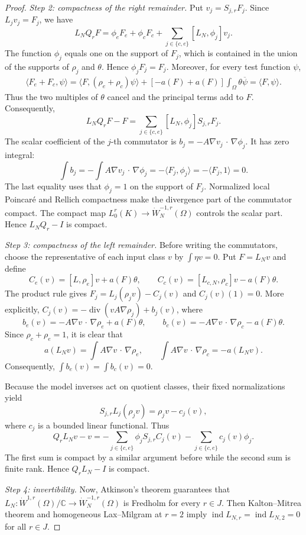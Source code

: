 \documentclass[12pt]{amsart}
\newcommand{\cdo}{\, \cdot \,}
\newcommand{\diver}{\operatorname{div}}
\theoremstyle{remark}
\begin{document}
\begin{proof}
\emph{Step 2: compactness of the right remainder.}
Put \(v_j=S_{j,r}F_j\).  Since \(L_jv_j=F_j\), we have
\[
 L_NQ_rF
 =\phi_eF_e+\phi_cF_c
  +\sum_{j\in\{c,e\}}[L_N,\phi_j]v_j.
\]
The function \(\phi_j\) equals one on the support of \(F_j\), which is
contained in the union of the supports of \(\rho_j\) and \(\theta\).
Hence \(\phi_jF_j=F_j\).  Moreover, for every test function \(\psi\),
\[
 \begin{aligned}
 \langle F_e+F_c,\psi\rangle
 =\langle F,(\rho_e+\rho_c)\psi\rangle
   +[-a(F)+a(F)]\int_\Omega\theta\overline\psi=\langle F,\psi\rangle.
 \end{aligned}
\]
Thus the two multiples of \(\theta\) cancel and the principal terms add
to \(F\).  Consequently,
\[
 L_NQ_rF-F
 =\sum_{j\in\{c,e\}}[L_N,\phi_j]S_{j,r}F_j.
\]
The scalar coefficient of the \(j\)-th commutator is $b_j=-A\nabla v_j\mathbin{\cdo}\nabla\phi_j$. It has zero integral:
\[
 \int b_j
 =-\int A\nabla v_j\mathbin{\cdo}\nabla\phi_j
 =-\langle F_j,\phi_j\rangle
 =-\langle F_j,1\rangle=0.
\]
The last equality uses that \(\phi_j=1\) on the support of \(F_j\).
Normalized local Poincar\'e and Rellich compactness make the divergence part of the commutator compact. The compact map
\(L^r_0(K)\to\dot W^{-1,r}_N(\Omega)\) controls the scalar part. Hence \(L_NQ_r-I\) is compact.

\emph{Step 3: compactness of the left remainder.}
Before writing the commutators, choose the representative of
each input class \(v\) by \(\int\eta v=0\).  Put \(F=L_Nv\) and define
\[
 C_e(v)=[L,\rho_e]v+a(F)\theta,
 \qquad
 C_c(v)=[L_{c,N},\rho_c]v-a(F)\theta.
\]
The product rule gives $F_j=L_j(\rho_jv)-C_j(v)$ and $C_j(v)(1)=0$. More explicitly, $C_j(v)=-\diver(vA\nabla\rho_j)+b_j(v)$, where
\[
 b_e(v)=-A\nabla v\mathbin{\cdo}\nabla\rho_e+a(F)\theta,
 \qquad
 b_c(v)=-A\nabla v\mathbin{\cdo}\nabla\rho_c-a(F)\theta.
\]
Since \(\rho_c+\rho_e=1\), it is clear that
\[
 a(L_Nv)=\int A\nabla v\mathbin{\cdo}\nabla\rho_e,
 \qquad
 \int A\nabla v\mathbin{\cdo}\nabla\rho_c=-a(L_Nv).
\]
Consequently, $\int b_e(v)=\int b_c(v)=0$.

Because the model inverses act on quotient classes, their fixed
normalizations yield
\[
 S_{j,r}L_j(\rho_jv)=\rho_jv-c_j(v),
\]
where \(c_j\) is a bounded linear functional.  Thus
\[
 Q_rL_Nv-v
 =-\sum_{j\in\{c,e\}}\phi_jS_{j,r}C_j(v)
  -\sum_{j\in\{c,e\}}c_j(v)\phi_j.
\]
The first sum is compact by a similar argument before while the second sum is finite rank. Hence \(Q_rL_N-I\) is compact.

\emph{Step 4: invertibility.}
Now, Atkinson's theorem guarantees that $L_N:\dot W^{1,r}(\Omega)/\mathbb C \longrightarrow\dot W^{-1,r}_N(\Omega)$ is Fredholm for every \(r\in J\). Then Kalton--Mitrea theorem and homogeneous Lax--Milgram at \(r=2\) imply $\operatorname{ind}L_{N,r}=\operatorname{ind}L_{N,2}=0$ for all $r\in J$.


\end{proof}
\end{document}
